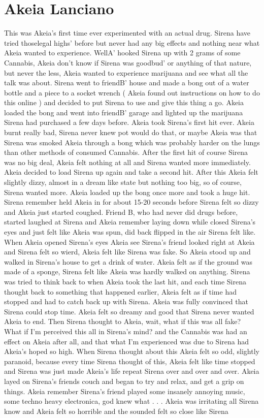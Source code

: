 \documentclass[12pt]{book}
\begin{document}
\chapter{Akeia Lanciano}

This was Akeia's first time ever experimented with an actual drug. Sirena have tried thoselegal highs' before but never had any big effects and nothing near what Akeia wanted to experience. WellA' hooked Sirena up with 2 grams of some Cannabis, Akeia don't know if Sirena was goodbud' or anything of that nature, but never the less, Akeia wanted to experience marijuana and see what all the talk was about. Sirena went to friendB' house and made a bong out of a water bottle and a piece to a socket wrench ( Akeia found out instructions on how to do this online ) and decided to put Sirena to use and give this thing a go. Akeia loaded the bong and went into friendB' garage and lighted up the marijuana Sirena had purchased a few days before. Akeia took Sirena's first hit ever. Akeia burnt really bad, Sirena never knew pot would do that, or maybe Akeia was that Sirena was smoked Akeia through a bong which was probably harder on the lungs than other methods of consumed Cannabis. After the first hit of course Sirena was no big deal, Akeia felt nothing at all and Sirena wanted more immediately. Akeia decided to load Sirena up again and take a second hit. After this Akeia felt slightly dizzy, almost in a dream like state but nothing too big, so of course, Sirena wanted more. Akeia loaded up the bong once more and took a huge hit. Sirena remember held Akeia in for about 15-20 seconds before Sirena felt so dizzy and Akeia just started coughed. Friend B, who had never did drugs before, started laughed at Sirena and Akeia remember laying down while closed Sirena's eyes and just felt like Akeia was spun, did back flipped in the air Sirena felt like. When Akeia opened Sirena's eyes Akeia see Sirena's friend looked right at Akeia and Sirena felt so wierd, Akeia felt like Sirena was fake. So Akeia stood up and walked in Sirena's house to get a drink of water. Akeia felt as if the ground was made of a sponge, Sirena felt like Akeia was hardly walked on anything. Sirena was tried to think back to when Akeia took the last hit, and each time Sirena thought back to something that happened earlier, Akeia felt as if time had stopped and had to catch back up with Sirena. Akeia was fully convinced that Sirena could stop time. Akeia felt so dreamy and good that Sirena never wanted Akeia to end. Then Sirena thought to Akeia, wait, what if this was all fake? What if I'm perceived this all in Sirena's mind? and the Cannabis was had an effect on Akeia after all, and that what I'm experienced was due to Sirena had Akeia's hoped so high. When Sirena thought about this Akeia felt so odd, slightly paranoid, because every time Sirena thought of this, Akeia felt like time stopped and Sirena was just made Akeia's life repeat Sirena over and over and over. Akeia layed on Sirena's friends couch and began to try and relax, and get a grip on things. Akeia remember Sirena's friend played some insanely annoying music, some techno heavy electronica, god knew what . . .  Akeia was irritating all Sirena know and Akeia felt so horrible and the sounded felt so close like Sirena 
\end{document}
